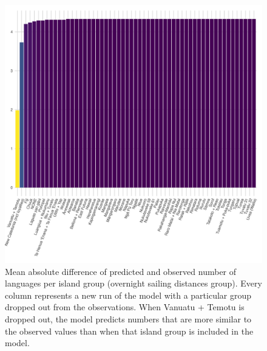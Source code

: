 \documentclass[unnumsec,webpdf,modern,medium]{oup-authoring-template}
\begin{document}
\begin{appendices}
\begin{figure}[ht]
\includegraphics[width=\textwidth]{brms_SBZR_dropped_out_plot_diff.png}
\caption{Mean absolute difference of predicted and observed number of languages per island group (overnight sailing distances group). Every column represents a new run of the model with a particular group dropped out from the observations. When Vanuatu + Temotu is dropped out, the model predicts numbers that are more similar to the observed values than when that island group is included in the model.}
\label{brms_SBZR_dropped_out_plot_diff}
\end{figure}


\end{appendices}
\end{document}
